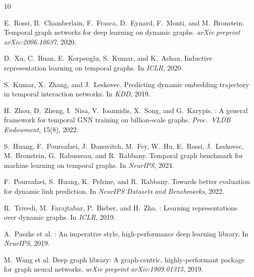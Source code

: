 \documentclass[10pt,twocolumn]{article}
\begin{document}

\begin{thebibliography}{10}

E.~Rossi, B.~Chamberlain, F.~Frasca, D.~Eynard, F.~Monti, and M.~Bronstein.
\newblock Temporal graph networks for deep learning on dynamic graphs.
\newblock \emph{arXiv preprint arXiv:2006.10637}, 2020.

D.~Xu, C.~Ruan, E.~Korpeoglu, S.~Kumar, and K.~Achan.
\newblock Inductive representation learning on temporal graphs.
\newblock In \emph{ICLR}, 2020.

S.~Kumar, X.~Zhang, and J.~Leskovec.
\newblock Predicting dynamic embedding trajectory in temporal interaction networks.
\newblock In \emph{KDD}, 2019.

H.~Zhou, D.~Zheng, I.~Nisa, V.~Ioannidis, X.~Song, and G.~Karypis.
: A general framework for temporal {GNN} training on billion-scale graphs.
\newblock \emph{Proc.\ VLDB Endowment}, 15(8), 2022.

S.~Huang, F.~Poursafaei, J.~Danovitch, M.~Fey, W.~Hu, E.~Rossi, J.~Leskovec, M.~Bronstein, G.~Rabusseau, and R.~Rabbany.
\newblock Temporal graph benchmark for machine learning on temporal graphs.
\newblock In \emph{NeurIPS}, 2024.

F.~Poursafaei, S.~Huang, K.~Pelrine, and R.~Rabbany.
\newblock Towards better evaluation for dynamic link prediction.
\newblock In \emph{NeurIPS Datasets and Benchmarks}, 2022.

R.~Trivedi, M.~Farajtabar, P.~Bisber, and H.~Zha.
: Learning representations over dynamic graphs.
\newblock In \emph{ICLR}, 2019.

A.~Paszke et al.
: An imperative style, high-performance deep learning library.
\newblock In \emph{NeurIPS}, 2019.

M.~Wang et al.
\newblock Deep graph library: A graph-centric, highly-performant package for graph neural networks.
\newblock \emph{arXiv preprint arXiv:1909.01315}, 2019.

\end{thebibliography}
\end{document}
